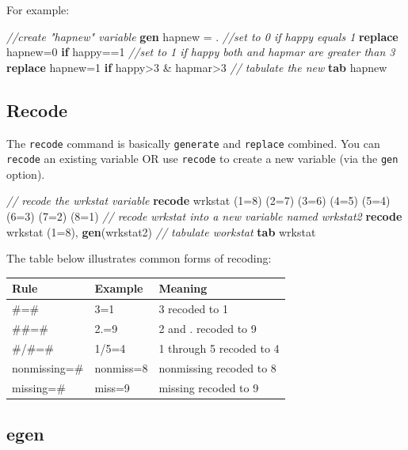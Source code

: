 \documentclass[
]{book}
\newenvironment{Shaded}{\begin{snugshade}}{\end{snugshade}}
\newcommand{\CommentTok}[1]{\textcolor[rgb]{0.56,0.35,0.01}{\textit{#1}}}
\newcommand{\KeywordTok}[1]{\textcolor[rgb]{0.13,0.29,0.53}{\textbf{#1}}}
\newcommand{\NormalTok}[1]{#1}
\begin{document}
For example:

\begin{Shaded}
\begin{Highlighting}[]
\CommentTok{//create "hapnew" variable}
\KeywordTok{gen}\NormalTok{ hapnew = .}
\CommentTok{//set to 0 if happy equals 1}
\KeywordTok{replace}\NormalTok{ hapnew=0 }\KeywordTok{if}\NormalTok{ happy==1 }
\CommentTok{//set to 1 if happy both and hapmar are greater than 3}
\KeywordTok{replace}\NormalTok{ hapnew=1 }\KeywordTok{if}\NormalTok{ happy\textgreater{}3 \& hapmar\textgreater{}3 }
\CommentTok{// tabulate the new }
\KeywordTok{tab}\NormalTok{ hapnew}
\end{Highlighting}
\end{Shaded}

\hypertarget{recode}{%
\subsection{Recode}\label{recode}}

The \texttt{recode} command is basically \texttt{generate} and \texttt{replace} combined. You can \texttt{recode} an existing variable OR use \texttt{recode} to create a new variable (via the \texttt{gen} option).

\begin{Shaded}
\begin{Highlighting}[]
\CommentTok{// recode the wrkstat variable }
\KeywordTok{recode}\NormalTok{ wrkstat (1=8) (2=7) (3=6) (4=5) (5=4) (6=3) (7=2) (8=1)}
\CommentTok{// recode wrkstat into a new variable named wrkstat2}
\KeywordTok{recode}\NormalTok{ wrkstat (1=8), }\KeywordTok{gen}\NormalTok{(wrkstat2)}
\CommentTok{// tabulate workstat}
\KeywordTok{tab}\NormalTok{ wrkstat}
\end{Highlighting}
\end{Shaded}

The table below illustrates common forms of recoding:

\begin{longtable}[]{@{}lll@{}}
\toprule
Rule & Example & Meaning\tabularnewline
\midrule
\endhead
\#=\# & 3=1 & 3 recoded to 1\tabularnewline
\#\#=\# & 2.=9 & 2 and . recoded to 9\tabularnewline
\#/\#=\# & 1/5=4 & 1 through 5 recoded to 4\tabularnewline
nonmissing=\# & nonmiss=8 & nonmissing recoded to 8\tabularnewline
missing=\# & miss=9 & missing recoded to 9\tabularnewline
\bottomrule
\end{longtable}

\hypertarget{egen}{%
\subsection{egen}\label{egen}}
\end{document}
